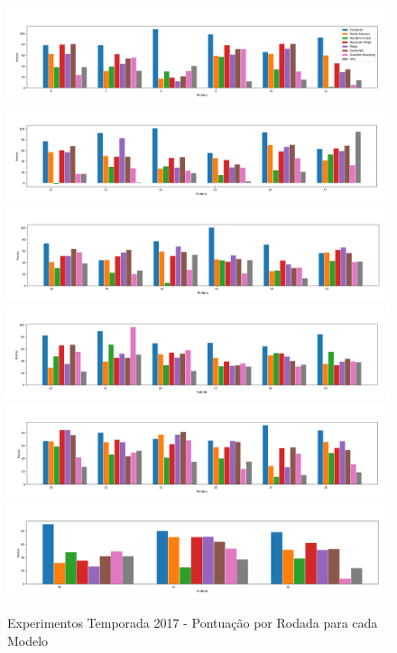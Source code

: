 \documentclass[conference]{IEEEtran}
\begin{document}
\begin{figure}[H]
  \vspace{-0.5cm}
  \includegraphics[trim={0 1.3cm 0 0}, clip, width=\textwidth]{images/bar_1.png}
  \includegraphics[trim={0 1.3cm 0 0}, clip, width=\textwidth]{images/bar_2.png}
  \includegraphics[trim={0 1.3cm 0 0}, clip, width=\textwidth]{images/bar_3.png}
  \includegraphics[trim={0 1.3cm 0 0}, clip, width=\textwidth]{images/bar_4.png}
  \includegraphics[trim={0 1.3cm 0 0}, clip, width=\textwidth]{images/bar_5.png}
  \includegraphics[width=\textwidth]{images/bar_6.png}
  \caption{Experimentos Temporada 2017 - Pontuação por Rodada para cada Modelo}
  \label{fig:bar_round}
\end{figure}
\end{document}

